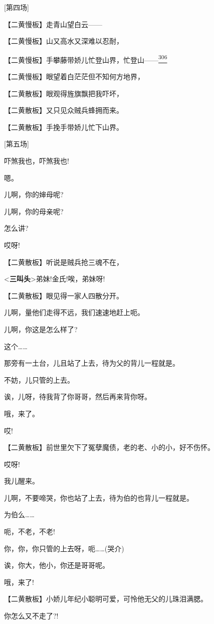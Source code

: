 {[}第四场{]}

【二黄慢板】走青山望白云------

【二黄慢板】山又高水又深难以忍耐，

【二黄慢板】手攀藤带娇儿忙登山界，忙登山------\protect\hyperlink{fn306}{\textsuperscript{306}}

【二黄慢板】眼望着白茫茫但不知何方地界，

【二黄散板】眼观得旌旗飘把我吓坏，

【二黄散板】又只见众贼兵蜂拥而来。

【二黄散板】手挽手带娇儿忙下山界。

{[}第五场{]}

吓煞我也，吓煞我也!

嗯。

儿啊，你的婶母呢?

儿啊，你的母亲呢?

怎么讲?

哎呀!

【二黄散板】听说是贼兵抢三魂不在，

\textless{}\textbf{三叫头}\textgreater{}弟妹!金氏!唉，弟妹呀!

【二黄散板】眼见得一家人四散分开。

儿啊，量他们走得不远，我们速速地赶上呃。

儿啊，你这是怎么样了?

这个\ldots{}\ldots{}

那旁有一土台，儿且站了上去，待为父的背儿一程就是。

不妨，儿只管的上去。

诶，儿呀，待我背了你哥哥，然后再来背你呀。

哦，来了。

哎!

【二黄散板】前世里欠下了冤孽魔债，老的老、小的小，好不伤怀。

哎呀!

我儿醒来。

儿啊，不要啼哭，你也站了上去，待为伯的也背儿一程就是。

为伯么\ldots{}\ldots{}

呃，不老，不老!

你，你，你只管的上去呀，呃\ldots{}\ldots{}(哭介)

诶，你大，他小，你还是哥哥呢。

哦，来了!

【二黄散板】小娇儿年纪小聪明可爱，可怜他无父的儿珠泪满腮。

你怎么又不走了?!


